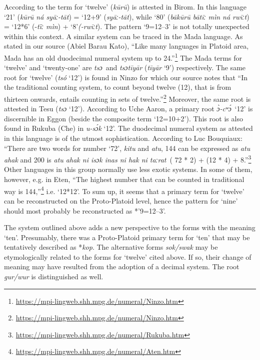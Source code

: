 According to \citet{Bouquiaux1962} the term for ‘twelve’ (\textit{k{\={u}}r{\={u}}}) is attested in Birom.  In this language ‘21’ (\textit{k{\={u}}r{\={u}} ná syāː-tāt}) = ‘12+9’ (\textit{syāː-tāt}), while ‘80’ (\textit{bāk{\={u}}r{\={u}} bātīː mìn ná rwīːt}) = ‘12*6’ (-\textit{t{\=ī}ː mìn}) + ‘8’\textit{(-rwīːt}). The pattern ‘9=12--3’ is not totally unexpected within this context. A similar system can be traced in the Mada language. As stated in our source (Abiel Barau Kato), “Like many languages in Platoid area, Mada has an old duodecimal numeral system up to 24.”\footnote{\url{https://mpi-lingweb.shh.mpg.de/numeral/Ninzo.htm}} The Mada terms for ‘twelve’ and ‘twenty-one’ are \textit{tsɔ}~and \textit{tsɔtīyār} (\textit{tīyār} ‘9’) respectively. The same root for ‘twelve’ (\textit{tsó} ‘12’) is found in Ninzo for which our source notes that ``In the traditional counting system, to count beyond twelve (12), that is from thirteen onwards, entails counting in sets of twelve.''\footnote{\url{https://mpi-lingweb.shh.mpg.de/numeral/Ninzo.htm}} Moreover, the same root is attested in Tesu (\textit{tsɔ} ‘12’). According to Uche Aaron, a primary root \textit{{\`{ɔ}}-cʷ{\'{ɔ}}}~‘12’ is discernible in Eggon (beside the composite term ‘12=10+2’). This root is also found in Rukuba (Che) in \textit{u-s{\'{ɔ}}k} ‘12’. The duodecimal numeral system as attested in this language is of the utmost sophistication. According to Luc Bouquiaux: ``There are two words for number `72', \textit{kitu} and \textit{atu}, 144 can be expressed as \textit{atu ahak} and 200 is \textit{atu ahak ni isɔk inas ni hak ni taːrat}~( 72 * 2) + (12 * 4) + 8.''\footnote{\url{https://mpi-lingweb.shh.mpg.de/numeral/Rukuba.htm}} Other languages in this group normally use less exotic systems. In some of them, however, e.g. in Eten, ``The highest number that can be counted in traditional way is 144,''\footnote{\url{https://mpi-lingweb.shh.mpg.de/numeral/Aten.htm}} i.e. ‘12*12’. To sum up, it seems that a primary term for ‘twelve’ can be reconstructed on the Proto-Platoid level, hence the pattern for ‘nine’ should most probably be reconstructed as *’9=12--3’. 

The system outlined above adds a new perspective to the forms with the meaning ‘ten’. Presumably, there was a Proto-Platoid primary term for ‘ten’ that may be tentatively described as *\textit{kop}. The alternative forms \textit{sok/swak} may be etymologically related to the forms for ‘twelve’ cited above. If so, their change of meaning may have resulted from the adoption of a decimal system. The root \textit{gur/wur} is distinguished as well.

